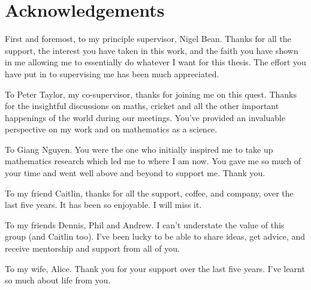 \chapter{Acknowledgements}
\label{ch:acknowledgements}

First and foremost, to my principle supervisor, Nigel Bean. Thanks for all the support, the interest you have taken in this work, and the faith you have shown in me allowing me to essentially do whatever I want for this thesis. The effort you have put in to supervising me has been much appreciated. 

To Peter Taylor, my co-supervisor, thanks for joining me on this quest. Thanks for the insightful discussions on maths, cricket and all the other important happenings of the world during our meetings. You've provided an invaluable perspective on my work and on mathematics as a science. 

To Giang Nguyen. You were the one who initially inspired me to take up mathematics research which led me to where I am now. You gave me so much of your time and went well above and beyond to support me. Thank you. 

To my friend Caitlin, thanks for all the support, coffee, and company, over the last five years. It has been so enjoyable. I will miss it.

To my friends Dennis, Phil and Andrew. I can't understate the value of this group (and Caitlin too). I've been lucky to be able to share ideas, get advice, and receive mentorship and support from all of you. 

To my wife, Alice. Thank you for your support over the last five years. I've learnt so much about life from you. 